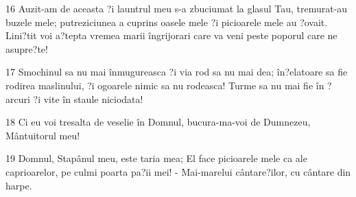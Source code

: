 \par 16 Auzit-am de aceasta ?i launtrul meu s-a zbuciumat la glasul Tau, tremurat-au buzele mele; putreziciunea a cuprins oasele mele ?i picioarele mele au ?ovait. Lini?tit voi a?tepta vremea marii îngrijorari care va veni peste poporul care ne asupre?te!
\par 17 Smochinul sa nu mai înmugureasca ?i via rod sa nu mai dea; în?elatoare sa fie rodirea maslinului, ?i ogoarele nimic sa nu rodeasca! Turme sa nu mai fie în ?arcuri ?i vite în staule niciodata!
\par 18 Ci eu voi tresalta de veselie în Domnul, bucura-ma-voi de Dumnezeu, Mântuitorul meu!
\par 19 Domnul, Stapânul meu, este taria mea; El face picioarele mele ca ale caprioarelor, pe culmi poarta pa?ii mei! - Mai-marelui cântare?ilor, cu cântare din harpe.


